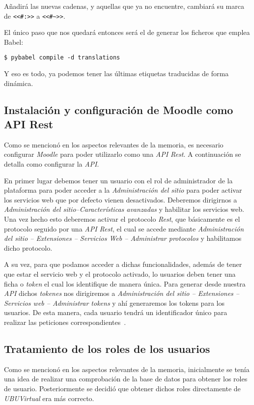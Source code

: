 Añadirá las nuevas cadenas, y aquellas que ya no encuentre, cambiará su marca de \texttt{<<\#:>>} a \texttt{<<\#\textasciitilde>>}.

El único paso que nos quedará entonces será el de generar los ficheros que emplea Babel:

\noindent\verb|$ pybabel compile -d translations|

Y eso es todo, ya podemos tener las últimas etiquetas traducidas de forma dinámica.

\subsection{Instalación y configuración de Moodle como API Rest}
Como se mencionó en los aspectos relevantes de la memoria, es necesario configurar \textit{Moodle} para poder utilizarlo como una \textit{API Rest}. A continuación se detalla como configurar la \textit{API}.

En primer lugar debemos tener un usuario con el rol de administrador de la plataforma para poder acceder a la \textit{Administración del sitio} para poder activar los servicios web que por defecto vienen desactivados. Deberemos dirigirnos a \textit{Administración del sitio--Características avanzadas} y habilitar los servicios web. Una vez hecho esto deberemos activar el protocolo \textit{Rest}, que básicamente es el protocolo seguido por una \textit{API Rest}, el cual se accede mediante \textit{Administración del sitio -- Extensiones -- Servicios Web -- Administrar protocolos} y habilitamos dicho protocolo.

A su vez, para que podamos acceder a dichas funcionalidades, además de tener que estar el servicio web y el protocolo activado, lo usuarios deben tener una ficha o \textit{token} el cual los identifique de manera única. Para generar desde nuestra \textit{API} dichos \textit{tokenes} nos dirigiremos a \textit{Administración del sitio -- Extensiones -- Servicios web -- Administrar tokens} y ahí generaremos los tokens para los usuarios. De esta manera, cada usuario tendrá un identificador único para realizar las peticiones correspondientes~\cite{moodle:api-rest-config}.

\subsection{Tratamiento de los roles de los usuarios}
Como se mencionó en los aspectos relevantes de la memoria, inicialmente se tenía una idea de realizar una comprobación de la base de datos para obtener los roles de usuario. Posteriormente se decidió que obtener dichos roles directamente de \textit{UBUVirtual} era más correcto.


